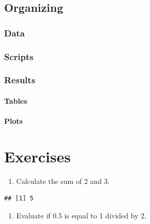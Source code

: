 \documentclass[
]{book}
\providecommand{\tightlist}{%
  \setlength{\itemsep}{0pt}\setlength{\parskip}{0pt}}
\begin{document}
\hypertarget{organizing}{%
\subsection{Organizing}\label{organizing}}

\hypertarget{data}{%
\subsubsection{Data}\label{data}}

\hypertarget{scripts}{%
\subsubsection{Scripts}\label{scripts}}

\hypertarget{results}{%
\subsubsection{Results}\label{results}}

\hypertarget{tables}{%
\paragraph{Tables}\label{tables}}

\hypertarget{plots}{%
\paragraph{Plots}\label{plots}}

\hypertarget{exercises}{%
\section*{Exercises}\label{exercises}}

\begin{enumerate}
\def\labelenumi{\arabic{enumi}.}
\tightlist
\item
  Calculate the sum of 2 and 3.
\end{enumerate}

\begin{verbatim}
## [1] 5
\end{verbatim}

\begin{enumerate}
\def\labelenumi{\arabic{enumi}.}
\setcounter{enumi}{1}
\tightlist
\item
  Evaluate if 0.5 is equal to 1 divided by 2.
\end{enumerate}
\end{document}
